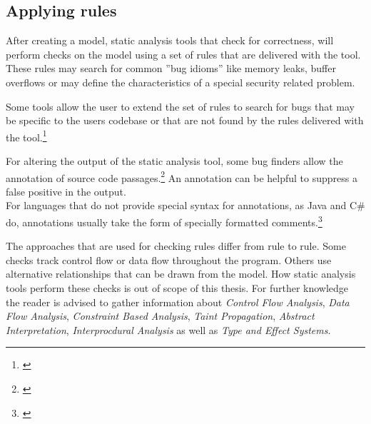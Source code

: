 \subsection{Applying rules}

After creating a model, static analysis tools that check for correctness, will perform checks on the model using a set of rules that are delivered with the tool. These rules may search for common ''bug idioms'' like memory leaks, buffer overflows or may define the characteristics of a special security related problem.

Some tools allow the user to extend the set of rules to search for bugs that may be specific to the users codebase or that are not found by the rules delivered with the tool.\footnote{\citep[97]{SecureProgramming}}

For altering the output of the static analysis tool, some bug finders allow the annotation of source code passages.\footnote{\citep[99]{SecureProgramming}} An annotation can be helpful to suppress a false positive in the output.
\\For languages that do not provide special syntax for annotations, as Java and C\# do, annotations usually
take the form of specially formatted comments.\footnote{\citep[99]{SecureProgramming}}

The approaches that are used for checking rules differ from rule to rule. Some checks track control flow or data flow throughout the program. Others use alternative relationships that can be drawn from the model. How static analysis tools perform these checks is out of scope of this thesis. For further knowledge the reader is advised to gather information about \textit{Control Flow Analysis}, \textit{Data Flow Analysis}, \textit{Constraint Based Analysis}, \textit{Taint Propagation}, \textit{Abstract Interpretation}, \textit{Interprocdural Analysis }as well as \textit{Type and Effect Systems}. 